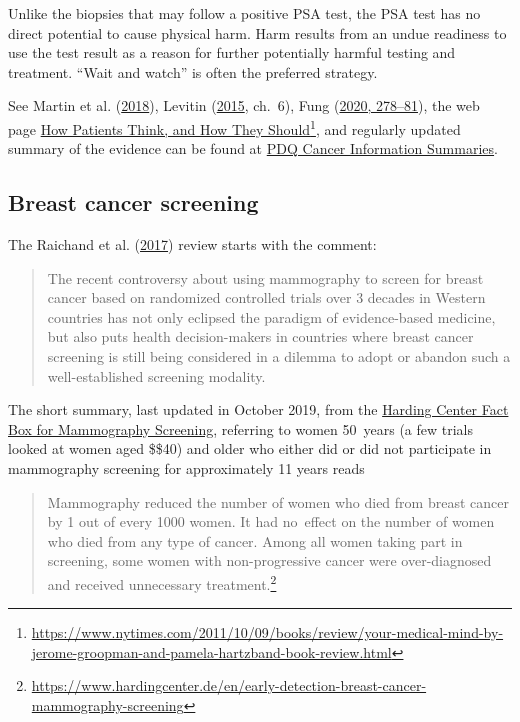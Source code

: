 \documentclass[
  10pt,
  b5paper]{book}
\begin{document}
Unlike the biopsies that may follow a positive PSA test, the PSA test
has no direct potential to cause physical harm. Harm results from an
undue readiness to use the test result as a reason for further
potentially harmful testing and treatment. ``Wait and watch'' is often
the preferred strategy.

See Martin et al. (\protect\hyperlink{ref-martin2018effect}{2018}), Levitin (\protect\hyperlink{ref-levitin_2015}{2015}, ch.~6), Fung (\protect\hyperlink{ref-fung2020cancer}{2020, 278--81}), the web page \href{https://www.nytimes.com/2011/10/09/books/review/your-medical-mind-by-jerome-groopman-and-pamela-hartzband-book-review.html}{How Patients Think, and How They
Should}\footnote{\url{https://www.nytimes.com/2011/10/09/books/review/your-medical-mind-by-jerome-groopman-and-pamela-hartzband-book-review.html}}, and
regularly updated summary of the evidence can be found at
\href{https://www.ncbi.nlm.nih.gov/books/NBK65906/}{PDQ Cancer Information Summaries}.

\hypertarget{breast-cancer-screening}{%
\subsection*{Breast cancer screening}\label{breast-cancer-screening}}

The Raichand et al. (\protect\hyperlink{ref-raichand2017conclusions}{2017}) review starts with the comment:

\begin{quote}
The recent controversy about using mammography to screen for breast
cancer based on randomized controlled trials over 3 decades in Western
countries has not only eclipsed the paradigm of evidence-based
medicine, but also puts health decision-makers in countries where
breast cancer screening is still being considered in a dilemma to
adopt or abandon such a well-established screening modality.
\end{quote}

The short summary, last updated in October 2019, from the \href{https://www.hardingcenter.de/en/early-detection-breast-cancer-mammography-screening}{Harding
Center Fact Box for Mammography
Screening},
referring to women 50~years (a few trials looked at women aged \$\geq\$40)
and older who either did or did not participate in mammography screening
for approximately 11 years reads

\begin{quote}
Mammography reduced the number of women who died from breast cancer by
1 out of every 1000 women. It had no~effect on the number of women who
died from any type of cancer. Among all women taking part in
screening, some women with non-progressive cancer were over-diagnosed
and received unnecessary treatment.\footnote{\url{https://www.hardingcenter.de/en/early-detection-breast-cancer-mammography-screening}}
\end{quote}
\end{document}
